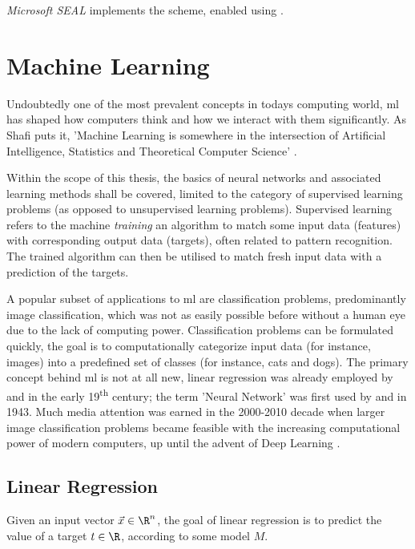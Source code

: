 \textit{Microsoft SEAL} implements the scheme, enabled using .

\pagebreak
\section{Machine Learning}
Undoubtedly one of the most prevalent concepts in todays computing world, \gls{ml} has shaped
how computers think and how we interact with them significantly.
As Shafi  puts it, 'Machine Learning is somewhere in the intersection of Artificial Intelligence,
Statistics and Theoretical Computer Science' \parencite{goldwasserTalk2018}.

Within the scope of this thesis, the basics of neural networks and associated learning methods shall be covered,
limited to the category of supervised learning problems (as opposed to unsupervised learning problems).
Supervised learning refers to the machine \textit{training} an algorithm to match some input data (features)
with corresponding output data (targets), often related to pattern recognition.
The trained algorithm can then be utilised to match fresh input data with a prediction of the targets.

A popular subset of applications to \gls{ml} are classification problems, predominantly image classification,
which was not as easily possible before without a human eye due to the lack of computing power.
Classification problems can be formulated quickly, the goal is to computationally categorize input data
(for instance, images) into a predefined set of classes (for instance, cats and dogs).
The primary concept behind \acrlong{ml} is not at all new, linear regression
was already employed by  and  in the early 19\textsuperscript{th} century;
the term 'Neural Network' was first used by  and  in 1943.
Much media attention was earned in the 2000-2010 decade when larger image classification problems
became feasible with the increasing computational power of modern computers,
up until the advent of Deep Learning \parencite{bishop-pattern-recognition-and-ml}.

\subsection{Linear Regression}
Given an input vector $\vec{x} \in \R^n$, the goal of linear regression is to predict the value of a target $t \in \R$,
according to some model $M$.

